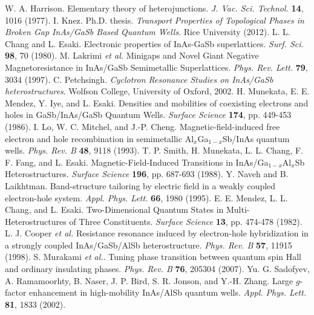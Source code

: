 \documentclass[titlepage,a4paper]{book}
\begin{document}
\begin{thebibliography}{199}
W. A. Harrison. Elementary theory of heterojunctions. \textit{J. Vac. Sci. Technol.} \textbf{14}, 1016 (1977).
I. Knez. Ph.D. thesis. \textit{Transport Properties of Topological Phases in Broken Gap InAs/GaSb Based Quantum Wells}. Rice University (2012).
L. L. Chang and L. Esaki. Electronic properties of InAs-GaSb superlattices. \textit{Surf. Sci.} \textbf{98}, 70 (1980).
M. Lakrimi \textit{et al.} Minigaps and Novel Giant Negative Magnetoresistance in InAs/GaSb Semimetallic Superlattices.  \textit{Phys. Rev. Lett.} \textbf{79}, 3034 (1997).
C. Petchsingh. \textit{Cyclotron Resonance Studies on InAs/GaSb heterostructures}. Wolfson College, University of Oxford, 2002.
H. Munekata, E. E. Mendez, Y. Iye, and L. Esaki. Densities and mobilities of coexisting electrons and holes in GaSb/InAs/GaSb Quantum Wells. \textit{Surface Science} \textbf{174}, pp. 449-453 (1986).
I. Lo, W. C. Mitchel, and J.-P. Cheng. Magnetic-field-induced free electron and hole recombination in semimetallic Al$_x$Ga$_{1-x}$Sb/InAs quantum wells. \textit{Phys. Rev. B} \textbf{48}, 9118 (1993).
T. P. Smith, H. Munekata, L. L. Chang, F. F. Fang, and L. Esaki. Magnetic-Field-Induced Transitions in InAs/Ga$_{1-x}$Al$_x$Sb Heterostructures. \textit{Surface Science} \textbf{196}, pp. 687-693 (1988).
Y. Naveh and B. Laikhtman. Band-structure tailoring by electric field in a weakly coupled electron-hole system. \textit{Appl. Phys. Lett.} \textbf{66}, 1980 (1995).
E. E. Mendez, L. L. Chang, and L. Esaki. Two-Dimensional Quantum States in Multi-Heterostructures of Three Constituents. \textit{Surface Science} \textbf{13}, pp. 474-478 (1982).
L. J. Cooper \textit{et al.} Resistance resonance induced by electron-hole hybridization in a strongly coupled InAs/GaSb/AlSb heterostructure. \textit{Phys. Rev. B} \textbf{57}, 11915 (1998).
S. Murakami \textit{et al.}. Tuning phase transition between quantum spin Hall and ordinary insulating phases. \textit{Phys. Rev. B} \textbf{76}, 205304 (2007).
Yu. G. Sadofyev, A. Ramamoorhty, B. Naser, J. P. Bird, S. R. Jonson, and Y.-H. Zhang. Large $g$-factor enhancement in high-mobility InAs/AlSb quantum wells. \textit{Appl. Phys. Lett.} \textbf{81}, 1833 (2002).
\end{thebibliography}

\listoffigures
\end{document}
